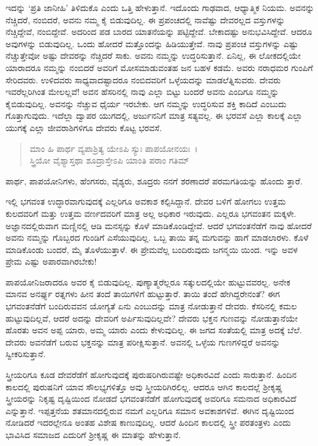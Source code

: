 ಇದನ್ನು ‘ಪ್ರತಿ ಜಾನೀಹಿ’ ತಿಳಿದುಕೊ ಎಂದು ಒತ್ತಿ ಹೇಳುತ್ತಾನೆ. ಇದೊಂದು ಗಾಢವಾದ, ಆಧ್ಯಾತ್ಮಿಕ ನಿಯಮ. ಅವನನ್ನು ನೆಚ್ಚಿದರೆ, ನಂಬಿದರೆ, ಅವನು ನಮ್ಮ ಕೈ ಬಿಡುವುದಿಲ್ಲ. ಈ ಪ್ರಪಂಚದಲ್ಲಿ ನಾವೆಷ್ಟು ದೇವರಲ್ಲದ ವಸ್ತುಗಳನ್ನು ನೆಚ್ಚಿದ್ದೇವೆ, ನಂಬಿದ್ದೇವೆ. ಅದರಿಂದ ಪಡ ಬಾರದ ಯಾತನೆಯನ್ನು ಪಟ್ಟಿದ್ದೇವೆ. ಬೇಕಾದಷ್ಟು ಅನುಭವಿಸಿದ್ದೇವೆ. ಆದರೂ ಅವುಗಳನ್ನು ಬಿಡುವುದಿಲ್ಲ. ಒಂದು ಹೋದರೆ ಮತ್ತೊಂದನ್ನು ಹಿಡಿಯುತ್ತೇವೆ. ನಾವು ಪ್ರಪಂಚ ವಸ್ತುಗಳನ್ನು ಎಷ್ಟು ನೆಚ್ಚುತ್ತೇವೋ ಅಷ್ಟು ದೇವರನ್ನು ನೆಚ್ಚಿದರೆ ಸಾಕು. ಅವನು ನಮ್ಮನ್ನು ಉದ್ಧರಿಸುತ್ತಾನೆ. ಏನಿಲ್ಲ, ಈ ಲೋಕದಲ್ಲಿಯೇ ಯಾರಾದರೂ ನಮ್ಮನ್ನು ನಂಬಿದರೆ ಅವರಿಗೆ ಮೋಸಮಾಡುವಂತಹ ಜನ ಬಹಳ ಕಡಮೆ. ಅವರು ನರಾಧಮರ ಗುಂಪಿಗೆ ಸೇರಿದವರು. ಉಳಿದವರು ಸಾಧ್ಯವಾದಷ್ಟಾದರೂ ನಂಬಿದವರಿಗೆ ಒಳ್ಳೆಯದನ್ನು ಮಾಡಲೆತ್ನಿಸುವರು. ದೇವರು ಇವರೆಲ್ಲರಿಗಿಂತ ಮೇಲಲ್ಲವೆ! ಅವನ ಹೆಸರಿನಲ್ಲಿ ನಾವು ಎಲ್ಲಾ ಬಿಟ್ಟು ಬಂದರೆ ಅವನು ಎಂದಿಗೂ ನಮ್ಮನ್ನು ಕೈಬಿಡುವುದಿಲ್ಲ. ಅವನನ್ನು ನೆಚ್ಚುವ ಧೈರ್ಯ ಇರಬೇಕು. ಆಗ ನಮ್ಮನ್ನು ಉದ್ಧರಿಸುವ ಶಕ್ತಿ ಕಾದಿದೆ ಎಂಬುದು ಗೊತ್ತಾಗುವುದು. ಇದೆಲ್ಲಾ ದ್ವಾಪರ ಯುಗದಲ್ಲಿ, ಅರ್ಜುನನಿಗೆ ಮಾತ್ರ ಸತ್ಯವಲ್ಲ. ಈ ಭರವಸೆ ಎಲ್ಲಾ ಕಾಲಕ್ಕೆ ಎಲ್ಲಾ ಯುಗಕ್ಕೆ ಎಲ್ಲಾ ಜೀವರಾಶಿಗಳಿಗೂ ದೇವರು ಕೊಟ್ಟ ಭರವಸೆ.

\begin{verse}
ಮಾಂ ಹಿ ಪಾರ್ಥ ವ್ಯಪಾಶ್ರಿತ್ಯ ಯೇಽಪಿ ಸ್ಯುಃ ಪಾಪಯೋನಯಃ~।\\ಸ್ತ್ರಿಯೋ ವೈಶ್ಯಾಸ್ತಥಾ ಶೂದ್ರಾಸ್ತೇಽಪಿ ಯಾಂತಿ ಪರಾಂ ಗತಿಮ್ 
\end{verse}

{\small ಪಾರ್ಥ, ಪಾಪಯೋನಿಗಳು, ಹೆಂಗಸರು, ವೈಶ್ಯರು, ಶೂದ್ರರು ನನಗೆ ಶರಣಾದರೆ ಪರಮಗತಿಯನ್ನು ಹೊಂದು ತ್ತಾರೆ.}

ಇಲ್ಲಿ ಭಗವಂತ ಉದ್ಧಾರವಾಗುವುದಕ್ಕೆ ಎಲ್ಲರಿಗೂ ಅವಕಾಶ ಕಲ್ಪಿಸಿದ್ದಾನೆ. ದೇವರ ಬಳಿಗೆ ಹೋಗಲು ಉತ್ತಮ ಕುಲದವರಿಗೆ ಮತ್ತು ಉತ್ತಮ ವರ್ಣದವರಿಗೆ ಮಾತ್ರ ಅಲ್ಲ ಅಧಿಕಾರ ಇರುವುದು. ಎಲ್ಲರೂ ಭಗವಂತನ ಮಕ್ಕಳೇ. ಅಜ್ಞಾನದಲ್ಲಿರುವಾಗ ಮಣ್ಣಿನಲ್ಲಿ ಆಡಿ ಮನಸ್ಸನ್ನು ಕೊಳೆ ಮಾಡಿಕೊಂಡಿದ್ದೇವೆ. ಆದರೆ ಭಗವಂತನೆಡೆಗೆ ನಾವು ಹೋದರೆ ಅವನು ನಮ್ಮನ್ನು ಗೊಬ್ಬರದ ಗುಂಡಿಗೆ ಎಸೆಯುವುದಿಲ್ಲ. ಒಬ್ಬ ತಾಯಿ ತನ್ನ ಮಗುವನ್ನು ಹಾಗೆ ಮಾಡಲಾರಳು. ಕೊಳೆ ಮಾಡಿಕೊಂಡು ಬಂದರೆ, ಮೈ ತೊಳೆಯುತ್ತಾಳೆ. ಈ ಪ್ರೇಮವೆಲ್ಲ ಬಂದಿರುವುದು ಜಗನ್ಮಯಿ ಯಿಂದ. ಇನ್ನು ಅವಳ ಪ್ರೇಮ ಎಷ್ಟು ಅಪಾರವಾಗಿರಬೇಕು!

ಪಾಪಯೋನಿಜರಾದರೂ ಅವರ ಕೈ ಬಿಡುವುದಿಲ್ಲ. ಪುಣ್ಯಾತ್ಮರೆಲ್ಲರೂ ಸತ್ಕುಲದಲ್ಲಿಯೇ ಹುಟ್ಟುವವರಲ್ಲ. ಅನೇಕ ಮಾನವ ಅನರ್ಘ್ಯ ರತ್ನಗಳು ಹೀನ ತಂದೆ ತಾಯಿಗಳಿಗೆ ಹುಟ್ಟುತ್ತಾರೆ. ತಾಯಿ ತಂದೆ ಹೇಗಿದ್ದರೇನಂತೆ? ಈಗ ಭಗವಂತನೆಡೆಗೆ ಬಂದಿರುವವನ ಯೋಗ್ಯತೆ ಏನು ಎಂಬುದನ್ನು ಮಾತ್ರ ನೋಡುತ್ತಾನೆ ದೇವರು. ಕೆಸರಿನಲ್ಲಿ ಕಮಲ ಹುಟ್ಟುವುದಿಲ್ಲವೆ, ಆದರೆ ಅದನ್ನು ದೇವರಿಗೆ ಅರ್ಪಿಸುವುದಿಲ್ಲವೇ? ದೇವರು ಭಕ್ತನ ಗುಣವನ್ನು ನೋಡುತ್ತಾನೆಯೇ ಹೊರತು ಅವನ ಅಪ್ಪ ಯಾರು, ಅಮ್ಮ ಯಾರು ಎಂದು ಕೇಳುವುದಿಲ್ಲ. ಈ ಜಗದ ಸಂತೆಯಲ್ಲಿ ಮಾತ್ರ ಅದಕ್ಕೆ ಬೆಲೆ. ದೇವರು ಅವನೆಡೆಗೆ ಬರುವ ಭಕ್ತನನ್ನು ಮಾತ್ರ ಪರೀಕ್ಷಿಸುತ್ತಾನೆ. ಅವನಲ್ಲಿ ಒಳ್ಳೆಯ ಗುಣಗಳಿದ್ದರೆ ಅವನನ್ನು ಸ್ವೀಕರಿಸುತ್ತಾನೆ.

ಸ್ತ್ರೀಯರಿಗೂ ಕೂಡ ದೇವರೆಡೆಗೆ ಹೋಗುವುದಕ್ಕೆ ಪುರುಷರಿಗಿರುವಷ್ಟೇ ಅಧಿಕಾರವಿದೆ ಎಂದು ಸಾರುತ್ತಾನೆ. ಹಿಂದಿನ ಕಾಲದಲ್ಲಿ ಪುರುಷನಿಗೆ ಯಾವ ಸೌಲಭ್ಯಗಳಿತ್ತೊ ಅವು ಸ್ತ್ರೀಯರಿಗಿರಲಿಲ್ಲ. ಆದರೂ ಆಗಿನ ಕಾಲದಲ್ಲೆ ಶ‍್ರೀಕೃಷ್ಣ ಸ್ತ್ರೀಯರನ್ನು ನಿಕೃಷ್ಟ ದೃಷ್ಟಿಯಿಂದ ನೋಡದೆ ಭಗವಂತನೆಡೆಗೆ ಹೋಗುವುದಕ್ಕೆ ಅವರಿಗೂ ಸಮನಾದ ಅಧಿಕಾರವಿದೆ ಎನ್ನುತ್ತಾನೆ. ಇಪ್ಪತ್ತನೆಯ ಶತಮಾನದಲ್ಲಿರುವ ನಮಗೆ ಎಲ್ಲರಿಗೂ ಸಮಾನ ಅವಕಾಶಗಳಿವೆ. ಈಗಿನ ದೃಷ್ಟಿಯಿಂದ ನೋಡಿದರೆ ಇದರಲ್ಲೇನೂ ಅಂತಹ ವಿಶೇಷ ಕಾಣುವುದಿಲ್ಲ. ಆದರೆ ಹಿಂದಿನ ಕಾಲದಲ್ಲಿ ಸ್ತ್ರೀ ಪರತಂತ್ರಳು ಎಂದು ಭಾವಿಸಿದ ಸಮಾಜದ ಎದುರಿಗೆ ಶ‍್ರೀಕೃಷ್ಣ ಈ ಮಾತನ್ನು ಹೇಳುತ್ತಾನೆ.

